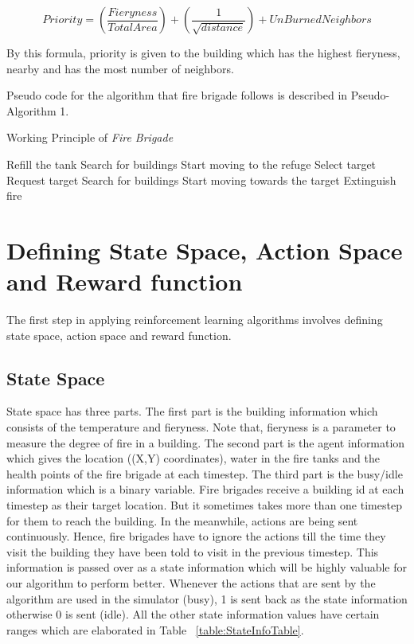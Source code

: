 \documentclass[12pt]{report}
\begin{document}
\[ Priority = (\frac{Fieryness}{Total Area}) + (\frac{1}{\sqrt{distance}}) + {UnBurnedNeighbors}  \]

By this formula, priority is given to the building which has the highest fieryness, nearby and has the most number of neighbors.

Pseudo code for the algorithm that fire brigade follows is described in Pseudo-Algorithm 1.

\begin{algorithm}
\caption{Working Principle of \emph{Fire Brigade}}
\begin{algorithmic}

\STATE  Refill the tank
\ENDIF 
{}
\STATE Search for buildings
\ENDIF
{}
\STATE Start moving to the refuge
\ENDIF
{}
\STATE Select target
\STATE Request target
\ELSE 
\STATE  Search for buildings 
\ENDIF 
\ENDIF
{}
\STATE Start moving towards the target
\ENDIF
{}
\STATE Extinguish fire
\ENDIF
\end{algorithmic}
\end{algorithm}


\section{Defining State Space, Action Space and Reward function}

The first step in applying reinforcement learning algorithms involves defining state space, action space and reward function. 

\subsection{State Space}
    
State space has three parts. The first part is the building information which consists of the temperature and fieryness. Note that, fieryness is a parameter to measure the degree of fire in a building. The second part is the agent information which gives the location ((X,Y) coordinates), water in the fire tanks and the health points of the fire brigade at each timestep. The third part is the busy/idle information which is a binary variable. Fire brigades receive a building id at each timestep as their target location. But it sometimes takes more than one timestep for them to reach the building. In the meanwhile, actions are being sent continuously. Hence, fire brigades have to ignore the actions till the time they visit the building they have been told to visit in the previous timestep. This information is passed over as a state information which will be highly valuable for our algorithm to perform better. Whenever the actions that are sent by the algorithm are used in the simulator (busy), 1 is sent back as the state information otherwise 0 is sent (idle). All the other state information values have certain ranges which are elaborated in Table ~\ref{table:StateInfoTable}. 
\end{document}
